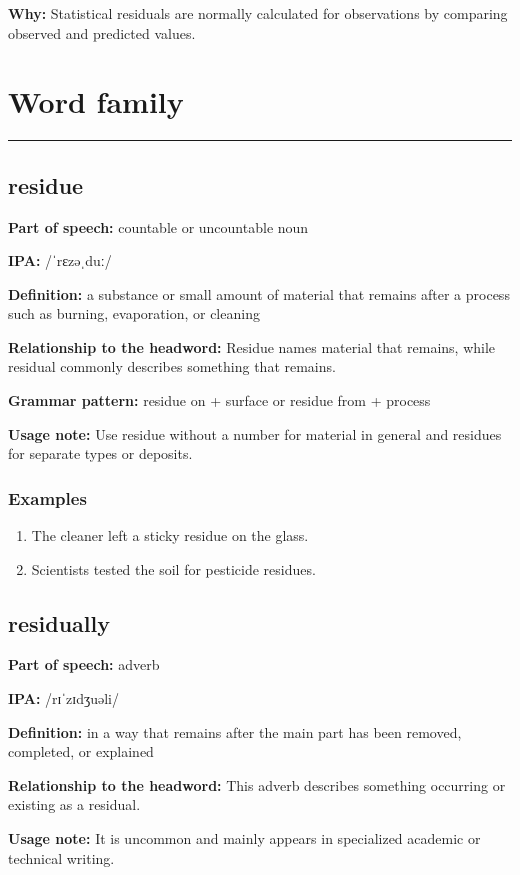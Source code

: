 \documentclass[11pt]{article}
\newcommand{\sectionrule}{\par\vspace{-0.5em}\noindent\textcolor{Accent}{\rule{\linewidth}{0.6pt}}\par}
\begin{document}
\textbf{Why:} Statistical residuals are normally calculated for observations by comparing observed and predicted values.

\section{Word family}
\sectionrule
\subsection{residue}
\textbf{Part of speech:} countable or uncountable noun

\textbf{IPA:} /ˈrɛzəˌduː/

\textbf{Definition:} a substance or small amount of material that remains after a process such as burning, evaporation, or cleaning

\textbf{Relationship to the headword:} Residue names material that remains, while residual commonly describes something that remains.

\textbf{Grammar pattern:} residue on + surface or residue from + process

\textbf{Usage note:} Use residue without a number for material in general and residues for separate types or deposits.

\subsubsection{Examples}
\begin{enumerate}
  \item The cleaner left a sticky residue on the glass.
  \item Scientists tested the soil for pesticide residues.
\end{enumerate}

\subsection{residually}
\textbf{Part of speech:} adverb

\textbf{IPA:} /rɪˈzɪdʒuəli/

\textbf{Definition:} in a way that remains after the main part has been removed, completed, or explained

\textbf{Relationship to the headword:} This adverb describes something occurring or existing as a residual.

\textbf{Usage note:} It is uncommon and mainly appears in specialized academic or technical writing.
\end{document}
